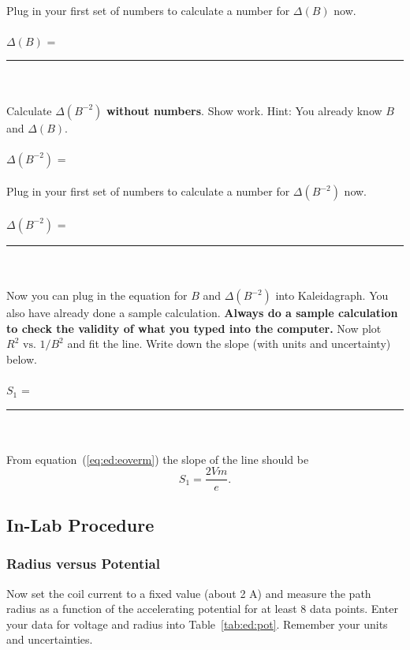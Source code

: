 \ \\
\noindent Plug in your first set of numbers to calculate a  number for 
$\Delta(B)$ now.\\
\vspace*{1cm} \\
\hspace*{5cm} $\Delta(B)$ =~\rule{3cm}{.1mm} \\
\ \\
\noindent Calculate $\Delta(B^{-2})$ {\bf without numbers}. Show work.
Hint: You already know $B$ and $\Delta(B)$.  \\
\vspace*{3cm} \\
\hspace*{5cm} $\Delta(B^{-2})$ = \\
\ \\
\noindent Plug in your first set of numbers to calculate a  number for 
$\Delta(B^{-2})$ now.  \\
\vspace*{1cm} \\
\hspace*{5cm} $\Delta(B^{-2})$ =~\rule{3cm}{.1mm} \\
\ \\
\noindent Now you can plug in the equation for $B$ and $\Delta(B^{-2})$
into Kaleidagraph.  You also have already done a sample
calculation.   {\bf Always do a sample calculation
to check the validity of what you typed into the computer.}  Now plot
$R^2 \mbox{ vs. } 1/B^2$ and fit the line.
Write down the slope (with units and uncertainty) below. \\
\ \\
\hspace*{5cm} $S_1$ =~\rule{3cm}{.1mm}\\ 
\ \\
\noindent From equation~(\ref{eq:ed:eoverm}) the slope of the line should be $$S_1=\frac{2Vm}{e}.$$


\subsection{In-Lab Procedure}
\subsubsection{Radius versus Potential}
\label{sec:ed:pot}

Now set the coil current to a fixed value (about 2 A) and measure the 
path radius as a function of the accelerating potential for at least 
8 data points.  Enter your data for voltage and radius into 
Table~\ref{tab:ed:pot}.  Remember
your units and uncertainties.\\

